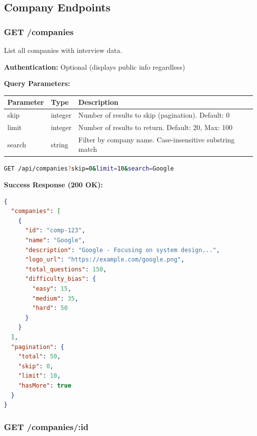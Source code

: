 \documentclass[12pt,a4paper,oneside]{article}
\begin{document}
\subsection{Company Endpoints}

\subsubsection{GET /companies}

List all companies with interview data.

\textbf{Authentication:} Optional (displays public info regardless)

\textbf{Query Parameters:}

\begin{table}[H]
\centering
\begin{tabular}{|p{2cm}|p{2cm}|p{8cm}|}
\hline
\textbf{Parameter} & \textbf{Type} & \textbf{Description} \\
\hline
skip & integer & Number of results to skip (pagination). Default: 0 \\
\hline
limit & integer & Number of results to return. Default: 20, Max: 100 \\
\hline
search & string & Filter by company name. Case-insensitive substring match \\
\hline
\end{tabular}
\end{table}

\begin{lstlisting}[language=bash, caption=Example Request]
GET /api/companies?skip=0&limit=10&search=Google
\end{lstlisting}

\textbf{Success Response (200 OK):}

\begin{lstlisting}[language=JSON, caption=Response 200]
{
  "companies": [
    {
      "id": "comp-123",
      "name": "Google",
      "description": "Google - Focusing on system design...",
      "logo_url": "https://example.com/google.png",
      "total_questions": 150,
      "difficulty_bias": {
        "easy": 15,
        "medium": 35,
        "hard": 50
      }
    }
  ],
  "pagination": {
    "total": 50,
    "skip": 0,
    "limit": 10,
    "hasMore": true
  }
}
\end{lstlisting}

\subsubsection{GET /companies/:id}
\end{document}
